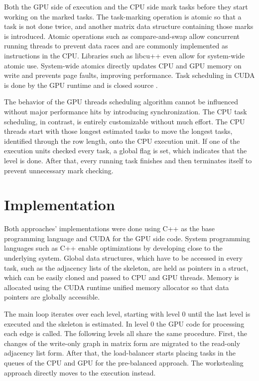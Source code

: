 Both the GPU side of execution and the CPU side mark tasks before they start working on the marked tasks. The task-marking operation is atomic so that a task is not done twice, and another matrix data structure containing those marks is introduced. Atomic operations such as compare-and-swap allow concurrent running threads to prevent data races and are commonly implemented as instructions in the CPU.
Libraries such as libcu++ \cite{NVIDIALibcudacxx2021} even allow for system-wide atomic use. System-wide atomics directly updates CPU and GPU memory on write and prevents page faults, improving performance.
Task scheduling in CUDA is done by the GPU runtime and is closed source \cite{olmedoDissectingCUDAScheduling2020}.

The behavior of the GPU threads scheduling algorithm cannot be influenced without major performance hits by introducing synchronization. The CPU task scheduling, in contrast, is entirely customizable without much effort. The CPU threads start with those longest estimated tasks to move the longest tasks, identified through the row length, onto the CPU execution unit.
If one of the execution units checked every task, a global flag is set, which indicates that the level is done. After that, every running task finishes and then terminates itself to prevent unnecessary mark checking.


\section{Implementation}
Both approaches' implementations were done using C++ as the base programming language and CUDA for the GPU side code. System programming languages such as C++ enable optimizations by developing close to the underlying system. Global data structures, which have to be accessed in every task, such as the adjacency lists of the skeleton, are held as pointers in a struct, which can be easily cloned and passed to CPU and GPU threads. Memory is allocated using the CUDA runtime unified memory allocator so that data pointers are globally accessible.

The main loop iterates over each level, starting with level 0 until the last level is executed and the skeleton is estimated. In level 0 the GPU code for processing each edge is called. The following levels all share the same procedure. First, the changes of the write-only graph in matrix form are migrated to the read-only adjacency list form. After that, the load-balancer starts placing tasks in the queues of the CPU and GPU for the pre-balanced approach. The workstealing approach directly moves to the execution instead.

